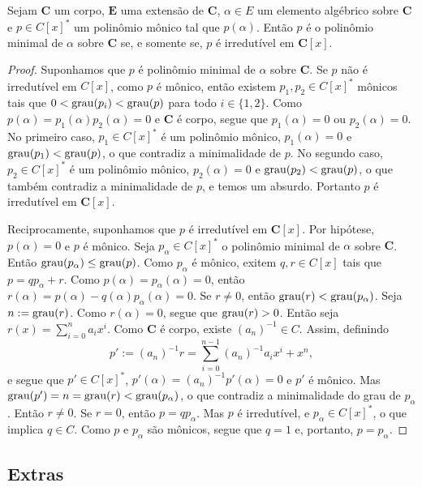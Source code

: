 \begin{prop}
	Sejam $\bm C$ um corpo, $\bm E$ uma extensão de $\bm C$, $\alpha \in E$ um elemento algébrico sobre $\bm C$ e $p \in C[x]^*$ um polinômio mônico tal que $p(\alpha)$. Então $p$ é o polinômio minimal de $\alpha$ sobre $\bm C$ se, e somente se, $p$ é irredutível em $\bm C[x]$.
\end{prop}
\begin{proof}
	Suponhamos que $p$ é polinômio minimal de $\alpha$ sobre $\bm C$. Se $p$ não é irredutível em $C[x]$, como $p$ é mônico, então existem $p_1,p_2 \in C[x]^*$ mônicos tais que $0 < \operatorname{grau}(p_i) < \operatorname{grau}(p)$ para todo $i \in \{1,2\}$. Como $p(\alpha)=p_1(\alpha)p_2(\alpha)=0$ e $\bm C$ é corpo, segue que $p_1(\alpha)=0$ ou $p_2(\alpha)=0$. No primeiro caso, $p_1 \in C[x]^*$ é um polinômio mônico, $p_1(\alpha)=0$ e $\operatorname{grau}(p_1) < \operatorname{grau}(p)$, o que contradiz a minimalidade de $p$. No segundo caso, $p_2 \in C[x]^*$ é um polinômio mônico, $p_2(\alpha)=0$ e $\operatorname{grau}(p_2) < \operatorname{grau}(p)$, o que também contradiz a minimalidade de $p$, e temos um absurdo. Portanto $p$ é irredutível em $\bm C[x]$.

	Reciprocamente, suponhamos que $p$ é irredutível em $\bm C[x]$. Por hipótese, $p(\alpha)=0$ e $p$ é mônico. Seja $p_\alpha \in C[x]^*$ o polinômio minimal de $\alpha$ sobre $\bm C$. Então $\operatorname{grau}(p_\alpha) \leq \operatorname{grau}(p)$. Como $p_\alpha$ é mônico, exitem $q,r \in C[x]$ tais que $p = qp_\alpha+r$. Como $p(\alpha) = p_\alpha(\alpha) = 0$, então $r(\alpha) = p(\alpha) - q(\alpha)p_\alpha(\alpha) = 0$. Se $r \neq 0$, então $\operatorname{grau}(r) < \operatorname{grau}(p_\alpha)$. Seja $n := \operatorname{grau}(r)$. Como $r(\alpha)=0$, segue que $\operatorname{grau}(r)>0$. Então seja $r(x) = \sum_{i=0}^n a_ix^i$. Como $\bm C$ é corpo, existe $(a_n)^{-1} \in C$. Assim, definindo
	\begin{equation*}
	p' := (a_n)^{-1}r = \sum_{i=0}^{n-1} (a_n)^{-1}a_ix^i + x^n,
	\end{equation*}
e segue que $p' \in C[x]^*$, $p'(\alpha)=(a_n)^{-1}p'(\alpha)=0$ e $p'$ é mônico. Mas $\operatorname{grau}(p') = n = \operatorname{grau}(r) < \operatorname{grau}(p_\alpha)$, o que contradiz a minimalidade do grau de $p_\alpha$. Então $r \neq 0$. Se $r=0$, então $p=qp_\alpha$. Mas $p$ é irredutível, e $p_\alpha \in C[x]^*$, o que implica $q \in C$. Como $p$ e $p_\alpha$ são mônicos, segue que $q=1$ e, portanto, $p=p_\alpha$.
\end{proof}



\subsection{Extras}

